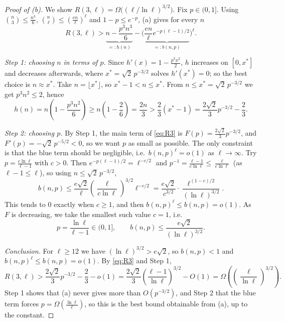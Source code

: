 \documentclass[a4paper,12pt]{article}
\begin{document}
\begin{proof}[Proof of (b)]
	We show $R(3, \ell) = \Omega\big( (\ell / \ln \ell)^{3/2} \big)$. Fix $p \in (0,1]$. Using $\binom n3 \le \frac{n^3}{6}$, $\binom n\ell \le \left( \frac{en}{\ell} \right)^\ell$ and $1 - p \le e^{-p}$, (a) gives for every $n$
	\begin{equation}
		R(3, \ell) > \underbrace{n - \frac{p^3 n^3}{6}}_{=: h(n)} - \Big( \underbrace{\frac{en}{\ell} e^{-p(\ell-1)/2}}_{=: b(n,p)} \Big)^\ell. \label{eq:R3} \tag{$\star$}
	\end{equation}

	\emph{Step 1: choosing $n$ in terms of $p$.} Since $h'(x) = 1 - \frac{p^3 x^2}{2}$, $h$ increases on $[0, x^*]$ and decreases afterwards, where $x^* = \sqrt 2 \, p^{-3/2}$ solves $h'(x^*) = 0$; so the best choice is $n \approx x^*$. Take $n = \lfloor x^* \rfloor$, so $x^* - 1 < n \le x^*$. From $n \le x^* = \sqrt 2 \, p^{-3/2}$ we get $p^3 n^2 \le 2$, hence
	\[
		h(n) = n \left( 1 - \frac{p^3 n^2}{6} \right) \ge n \left( 1 - \frac{2}{6} \right) = \frac{2n}{3} > \frac23 (x^* - 1) = \frac{2\sqrt 2}{3} p^{-3/2} - \frac23.
	\]

	\emph{Step 2: choosing $p$.} By Step 1, the main term of \eqref{eq:R3} is $F(p) = \frac{2\sqrt 2}{3} p^{-3/2}$, and $F'(p) = -\sqrt 2 \, p^{-5/2} < 0$, so we want $p$ as small as possible. The only constraint is that the blue term should be negligible, i.e.\ $b(n,p)^\ell = o(1)$ as $\ell \to \infty$. Try $p = \frac{c \ln \ell}{\ell - 1}$ with $c > 0$. Then $e^{-p(\ell-1)/2} = \ell^{-c/2}$ and $p^{-1} = \frac{\ell - 1}{c \ln \ell} \le \frac{\ell}{c \ln \ell}$ (as $\ell - 1 \le \ell$), so using $n \le \sqrt 2 \, p^{-3/2}$,
	\[
		b(n,p) \le \frac{e \sqrt 2}{\ell} \left( \frac{\ell}{c \ln \ell} \right)^{3/2} \ell^{-c/2} = \frac{e \sqrt 2}{c^{3/2}} \cdot \frac{\ell^{(1-c)/2}}{(\ln \ell)^{3/2}}.
	\]
	This tends to $0$ exactly when $c \ge 1$, and then $b(n,p)^\ell \le b(n,p) = o(1)$. As $F$ is decreasing, we take the smallest such value $c = 1$, i.e.
	\[
		p = \frac{\ln \ell}{\ell - 1} \in (0, 1], \qquad b(n,p) \le \frac{e \sqrt 2}{(\ln \ell)^{3/2}}.
	\]

	\emph{Conclusion.} For $\ell \ge 12$ we have $(\ln \ell)^{3/2} > e \sqrt 2$, so $b(n,p) < 1$ and $b(n,p)^\ell \le b(n,p) = o(1)$. By \eqref{eq:R3} and Step 1,
	\[
		R(3, \ell) > \frac{2 \sqrt 2}{3} p^{-3/2} - \frac23 - o(1) = \frac{2 \sqrt 2}{3} \left( \frac{\ell - 1}{\ln \ell} \right)^{3/2} - O(1) = \Omega\left( \left( \frac{\ell}{\ln \ell} \right)^{3/2} \right).
	\]
	Step 1 shows that (a) never gives more than $O(p^{-3/2})$, and Step 2 that the blue term forces $p = \Omega\left( \frac{\ln \ell}{\ell} \right)$, so this is the best bound obtainable from (a), up to the constant.
\end{proof}
\end{document}
